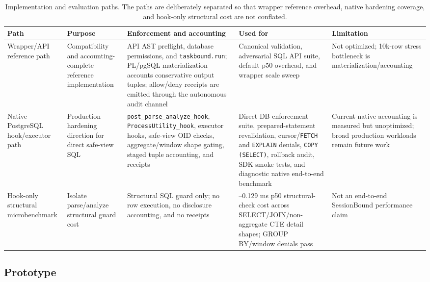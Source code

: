 \documentclass[journal]{IEEEtran}
\begin{document}
\begin{table}[!t]
\centering
\scriptsize
\setlength{\tabcolsep}{2.5pt}
\caption{Implementation and evaluation paths. The paths are deliberately separated so that wrapper reference overhead, native hardening coverage, and hook-only structural cost are not conflated.}
\label{tab:implementation-paths}
\begin{tabular}{@{}
  >{\raggedright\arraybackslash}p{}
  >{\raggedright\arraybackslash}p{}
  >{\raggedright\arraybackslash}p{}
  >{\raggedright\arraybackslash}p{}
  >{\raggedright\arraybackslash}p{}@{}}
\toprule
Path & Purpose & Enforcement and accounting & Used for & Limitation \\
\midrule
Wrapper/API reference path & Compatibility and accounting-complete reference implementation & API AST preflight, database permissions, and \texttt{taskbound.run}; PL/pgSQL materialization accounts conservative output tuples; allow/deny receipts are emitted through the autonomous audit channel & Canonical validation, adversarial SQL API suite, default p50 overhead, and wrapper scale sweep & Not optimized; 10k-row stress bottleneck is materialization/accounting \\
Native PostgreSQL hook/executor path & Production hardening direction for direct safe-view SQL & \texttt{post\_parse\_analyze\_hook}, \texttt{ProcessUtility\_hook}, executor hooks, safe-view OID checks, aggregate/window shape gating, staged tuple accounting, and receipts & Direct DB enforcement suite, prepared-statement revalidation, cursor/\texttt{FETCH} and \texttt{EXPLAIN} denials, \texttt{COPY (SELECT)}, rollback audit, SDK smoke tests, and diagnostic native end-to-end benchmark & Current native accounting is measured but unoptimized; broad production workloads remain future work \\
Hook-only structural microbenchmark & Isolate parse/analyze structural guard cost & Structural SQL guard only; no row execution, no disclosure accounting, and no receipts & 0.101--0.129 ms p50 structural-check cost across SELECT/JOIN/non-aggregate CTE detail shapes; GROUP BY/window denials pass & Not an end-to-end SessionBound performance claim \\
\bottomrule
\end{tabular}
\end{table}

\hypertarget{prototype}{%
\subsection{Prototype}\label{prototype}}
\end{document}
